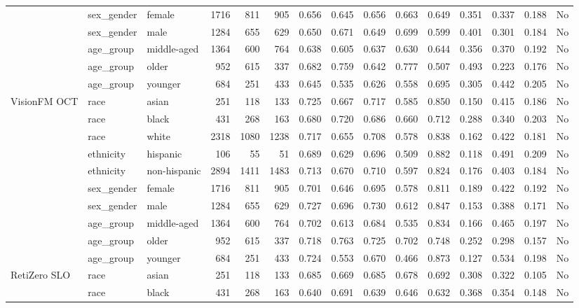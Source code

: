 \begin{longtable}{@{}lllrrrrrrrrrrrr@{}}
 & sex\_gender & female & 1716 & 811 & 905 & 0.656 & 0.645 & 0.656 & 0.663 & 0.649 & 0.351 & 0.337 & 0.188 & No \\
 & sex\_gender & male & 1284 & 655 & 629 & 0.650 & 0.671 & 0.649 & 0.699 & 0.599 & 0.401 & 0.301 & 0.184 & No \\
 & age\_group & middle-aged & 1364 & 600 & 764 & 0.638 & 0.605 & 0.637 & 0.630 & 0.644 & 0.356 & 0.370 & 0.192 & No \\
 & age\_group & older & 952 & 615 & 337 & 0.682 & 0.759 & 0.642 & 0.777 & 0.507 & 0.493 & 0.223 & 0.176 & No \\
 & age\_group & younger & 684 & 251 & 433 & 0.645 & 0.535 & 0.626 & 0.558 & 0.695 & 0.305 & 0.442 & 0.205 & No \\
VisionFM OCT & race & asian & 251 & 118 & 133 & 0.725 & 0.667 & 0.717 & 0.585 & 0.850 & 0.150 & 0.415 & 0.186 & No \\
 & race & black & 431 & 268 & 163 & 0.680 & 0.720 & 0.686 & 0.660 & 0.712 & 0.288 & 0.340 & 0.203 & No \\
 & race & white & 2318 & 1080 & 1238 & 0.717 & 0.655 & 0.708 & 0.578 & 0.838 & 0.162 & 0.422 & 0.181 & No \\
 & ethnicity & hispanic & 106 & 55 & 51 & 0.689 & 0.629 & 0.696 & 0.509 & 0.882 & 0.118 & 0.491 & 0.209 & No \\
 & ethnicity & non-hispanic & 2894 & 1411 & 1483 & 0.713 & 0.670 & 0.710 & 0.597 & 0.824 & 0.176 & 0.403 & 0.184 & No \\
 & sex\_gender & female & 1716 & 811 & 905 & 0.701 & 0.646 & 0.695 & 0.578 & 0.811 & 0.189 & 0.422 & 0.192 & No \\
 & sex\_gender & male & 1284 & 655 & 629 & 0.727 & 0.696 & 0.730 & 0.612 & 0.847 & 0.153 & 0.388 & 0.171 & No \\
 & age\_group & middle-aged & 1364 & 600 & 764 & 0.702 & 0.613 & 0.684 & 0.535 & 0.834 & 0.166 & 0.465 & 0.197 & No \\
 & age\_group & older & 952 & 615 & 337 & 0.718 & 0.763 & 0.725 & 0.702 & 0.748 & 0.252 & 0.298 & 0.157 & No \\
 & age\_group & younger & 684 & 251 & 433 & 0.724 & 0.553 & 0.670 & 0.466 & 0.873 & 0.127 & 0.534 & 0.198 & No \\
RetiZero SLO & race & asian & 251 & 118 & 133 & 0.685 & 0.669 & 0.685 & 0.678 & 0.692 & 0.308 & 0.322 & 0.105 & No \\
 & race & black & 431 & 268 & 163 & 0.640 & 0.691 & 0.639 & 0.646 & 0.632 & 0.368 & 0.354 & 0.148 & No \\

\end{longtable}
